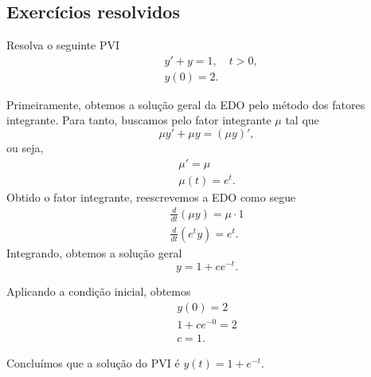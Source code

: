 \subsection*{Exercícios resolvidos}

\begin{exeresol}
  Resolva o seguinte PVI
  \begin{align}
    &y' + y = 1, \quad t>0,\\
    &y(0) = 2.
  \end{align}
\end{exeresol}
\begin{resol}
  Primeiramente, obtemos a solução geral da EDO pelo método dos fatores integrante. Para tanto, buscamos pelo fator integrante $\mu$ tal que
  \begin{equation}
    \mu y' + \mu y = (\mu y)',
  \end{equation}
  ou seja,
  \begin{gather}
    \mu' = \mu \\
    \mu(t) = e^{t}.
  \end{gather}
  Obtido o fator integrante, reescrevemos a EDO como segue
  \begin{gather}
    \frac{d}{dt}\left(\mu y\right) = \mu\cdot 1 \\
    \frac{d}{dt}\left(e^ty\right) = e^t.
  \end{gather}
  Integrando, obtemos a solução geral
  \begin{equation}
    y = 1 + ce^{-t}.
  \end{equation}

  Aplicando a condição inicial, obtemos
  \begin{gather}
    y(0) = 2 \\
    1 + ce^{-0} = 2 \\
    c = 1.
  \end{gather}

  Concluímos que a solução do PVI é $y(t) = 1 + e^{-t}$.
\end{resol}

